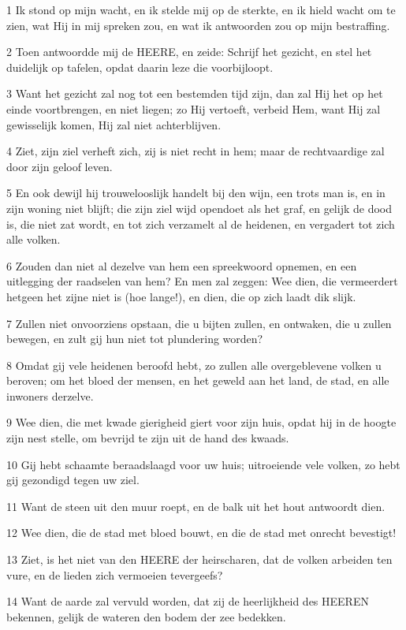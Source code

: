 \par 1 Ik stond op mijn wacht, en ik stelde mij op de sterkte, en ik hield wacht om te zien, wat Hij in mij spreken zou, en wat ik antwoorden zou op mijn bestraffing.
\par 2 Toen antwoordde mij de HEERE, en zeide: Schrijf het gezicht, en stel het duidelijk op tafelen, opdat daarin leze die voorbijloopt.
\par 3 Want het gezicht zal nog tot een bestemden tijd zijn, dan zal Hij het op het einde voortbrengen, en niet liegen; zo Hij vertoeft, verbeid Hem, want Hij zal gewisselijk komen, Hij zal niet achterblijven.
\par 4 Ziet, zijn ziel verheft zich, zij is niet recht in hem; maar de rechtvaardige zal door zijn geloof leven.
\par 5 En ook dewijl hij trouwelooslijk handelt bij den wijn, een trots man is, en in zijn woning niet blijft; die zijn ziel wijd opendoet als het graf, en gelijk de dood is, die niet zat wordt, en tot zich verzamelt al de heidenen, en vergadert tot zich alle volken.
\par 6 Zouden dan niet al dezelve van hem een spreekwoord opnemen, en een uitlegging der raadselen van hem? En men zal zeggen: Wee dien, die vermeerdert hetgeen het zijne niet is (hoe lange!), en dien, die op zich laadt dik slijk.
\par 7 Zullen niet onvoorziens opstaan, die u bijten zullen, en ontwaken, die u zullen bewegen, en zult gij hun niet tot plundering worden?
\par 8 Omdat gij vele heidenen beroofd hebt, zo zullen alle overgeblevene volken u beroven; om het bloed der mensen, en het geweld aan het land, de stad, en alle inwoners derzelve.
\par 9 Wee dien, die met kwade gierigheid giert voor zijn huis, opdat hij in de hoogte zijn nest stelle, om bevrijd te zijn uit de hand des kwaads.
\par 10 Gij hebt schaamte beraadslaagd voor uw huis; uitroeiende vele volken, zo hebt gij gezondigd tegen uw ziel.
\par 11 Want de steen uit den muur roept, en de balk uit het hout antwoordt dien.
\par 12 Wee dien, die de stad met bloed bouwt, en die de stad met onrecht bevestigt!
\par 13 Ziet, is het niet van den HEERE der heirscharen, dat de volken arbeiden ten vure, en de lieden zich vermoeien tevergeefs?
\par 14 Want de aarde zal vervuld worden, dat zij de heerlijkheid des HEEREN bekennen, gelijk de wateren den bodem der zee bedekken.
